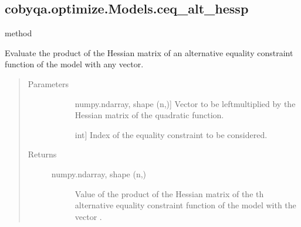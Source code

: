 \documentclass[letterpaper,10pt,english]{sphinxmanual}
\begin{document}
\begin{fulllineitems}
\subsection{cobyqa.optimize.Models.ceq\_alt\_hessp}
\label{\detokenize{refs/generated/cobyqa.optimize.Models.ceq_alt_hessp:cobyqa-optimize-models-ceq-alt-hessp}}\label{\detokenize{refs/generated/cobyqa.optimize.Models.ceq_alt_hessp::doc}}
\sphinxAtStartPar
method

\begin{fulllineitems}
\label{\detokenize{refs/generated/cobyqa.optimize.Models.ceq_alt_hessp:cobyqa.optimize.Models.ceq_alt_hessp}}
\sphinxAtStartPar
Evaluate the product of the Hessian matrix of an alternative equality
constraint function of the model with any vector.
\begin{quote}\begin{description}
\item[{Parameters}] \leavevmode\begin{description}
\item[{}] \leavevmode{[}numpy.ndarray, shape (n,){]}
\sphinxAtStartPar
Vector to be left\sphinxhyphen{}multiplied by the Hessian matrix of the quadratic
function.

\item[{}] \leavevmode{[}int{]}
\sphinxAtStartPar
Index of the equality constraint to be considered.

\end{description}

\item[{Returns}] \leavevmode\begin{description}
\item[{numpy.ndarray, shape (n,)}] \leavevmode
\sphinxAtStartPar
Value of the product of the Hessian matrix of the \sphinxhyphen{}th alternative
equality constraint function of the model with the vector .

\end{description}

\end{description}\end{quote}

\end{fulllineitems}




\end{fulllineitems}
\end{document}
